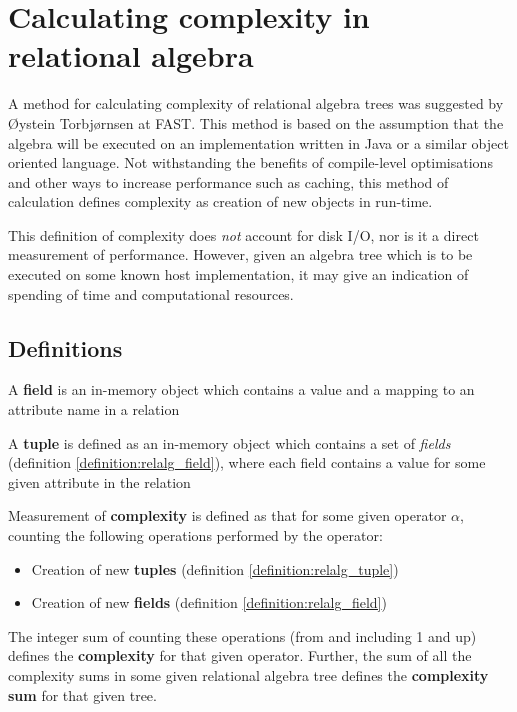 \section{Calculating complexity in relational algebra}
\label{sect:method:complexity}
A method for calculating complexity of relational algebra trees was suggested
by \O ystein Torbj\o rnsen at FAST. This method is based on the assumption
that the algebra will be executed on an implementation written in Java or a
similar object oriented language. Not withstanding the
benefits of compile-level optimisations and other ways to increase performance
such as caching, this method of calculation defines complexity as creation of
new objects in run-time.

This definition of complexity does \textit{not} account
for disk I/O, nor is it a direct measurement of performance. However, given
an algebra tree which is to be executed on some known host implementation, it
may give an indication of spending of time and computational resources.

\subsection{Definitions}
\begin{myDefinition}
A \textbf{field} is an in-memory object which contains a value and a mapping to
an attribute name in a relation
\label{definition:relalg_field}
\end{myDefinition}

\begin{myDefinition}
A \textbf{tuple} is defined as an in-memory object which contains a set of
\textit{fields} (definition \ref{definition:relalg_field}), where each field
contains a value for some given attribute in the relation
\label{definition:relalg_tuple}
\end{myDefinition}

\begin{myDefinition}
Measurement of \textbf{complexity} is defined as that for some given operator
$\alpha$, counting the following operations performed by the operator:
\begin{itemize}
  \item Creation of new \textbf{tuples} (definition
  \ref{definition:relalg_tuple})
  \item Creation of new \textbf{fields} (definition
  \ref{definition:relalg_field})
\end{itemize}
The integer sum of counting these operations (from and including 1 and up)
defines the \textbf{complexity} for that given operator. Further, the sum of
all the complexity sums in some given relational algebra tree defines the
\textbf{complexity sum} for that given tree.
\label{definition:relalg_complexity}
\end{myDefinition}

